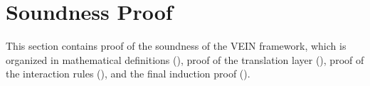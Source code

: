 \section{Soundness Proof}
\label{sec:soundness-proof}

This section contains proof of the soundness of the VEIN framework, which is organized in mathematical 
definitions (\textbf{}), proof of the translation layer (\textbf{}),
proof of the interaction rules (\textbf{}), and the final
induction proof (\textbf{}).








